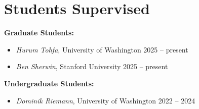 \section{Students Supervised}

\textbf{Graduate Students:}
\begin{itemize}
    \item \textit{Hurum Tohfa}, University of Washington \hfill 2025 -- present
    \item \textit{Ben Sherwin}, Stanford University \hfill 2025 -- present
\end{itemize}

\textbf{Undergraduate Students:}
\begin{itemize}
    \item \textit{Dominik Riemann}, University of Washington \hfill 2022 -- 2024
\end{itemize}
